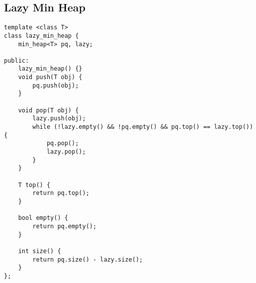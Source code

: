 \subsection{Lazy Min Heap}
\begin{lstlisting}
template <class T>
class lazy_min_heap {
    min_heap<T> pq, lazy;
    
public:
    lazy_min_heap() {}
    void push(T obj) {
        pq.push(obj);
    }
 
    void pop(T obj) {
        lazy.push(obj);
        while (!lazy.empty() && !pq.empty() && pq.top() == lazy.top()) {
            pq.pop();
            lazy.pop();
        }
    }
 
    T top() {
        return pq.top(); 
    }
 
    bool empty() {
        return pq.empty();
    }

    int size() {
        return pq.size() - lazy.size();
    }
};
\end{lstlisting}
